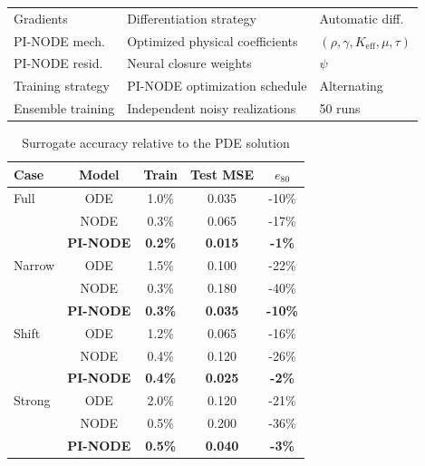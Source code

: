 \begin{table}[H]
\begin{tabular}{p{2.5cm} p{5.6cm} p{2.4cm}}
Gradients & Differentiation strategy & Automatic diff. \\

PI-NODE mech. & Optimized physical coefficients &
$(\rho,\gamma,K_{\mathrm{eff}},\mu,\tau)$ \\

PI-NODE resid. & Neural closure weights & $\psi$ \\

Training strategy & PI-NODE optimization schedule &
Alternating \\

Ensemble training & Independent noisy realizations &
50 runs \\
\hline
\end{tabular}
\end{table}

\begin{table}[H]
\caption{Surrogate accuracy relative to the PDE solution}
\label{tab:results}
\centering
\scriptsize
\setlength{\tabcolsep}{2pt}
\renewcommand{\arraystretch}{0.9}

\begin{tabular}{lcccc}
\hline
\textbf{Case} & \textbf{Model} & \textbf{Train} & \textbf{Test MSE} & \textbf{$e_{80}$} \\
\hline

Full
& ODE & 1.0\% & 0.035 & -10\% \\
& NODE & 0.3\% & 0.065 & -17\% \\
& \textbf{PI-NODE} & \textbf{0.2\%} & \textbf{0.015} & \textbf{-1\%} \\
\hline

Narrow
& ODE & 1.5\% & 0.100 & -22\% \\
& NODE & 0.3\% & 0.180 & -40\% \\
& \textbf{PI-NODE} & \textbf{0.3\%} & \textbf{0.035} & \textbf{-10\%} \\
\hline

Shift
& ODE & 1.2\% & 0.065 & -16\% \\
& NODE & 0.4\% & 0.120 & -26\% \\
& \textbf{PI-NODE} & \textbf{0.4\%} & \textbf{0.025} & \textbf{-2\%} \\
\hline

Strong
& ODE & 2.0\% & 0.120 & -21\% \\
& NODE & 0.5\% & 0.200 & -36\% \\
& \textbf{PI-NODE} & \textbf{0.5\%} & \textbf{0.040} & \textbf{-3\%} \\
\hline
\end{tabular}
\end{table}

